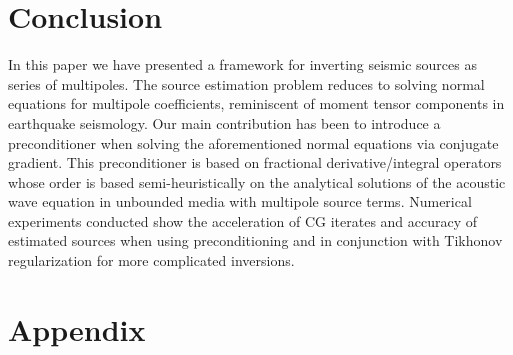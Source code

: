 


%

\section{Conclusion}
In this paper we have presented a framework for inverting seismic sources as series of multipoles.
The source estimation problem reduces to solving normal equations for multipole coefficients, reminiscent of moment tensor components in earthquake seismology.
Our main contribution has been to introduce a preconditioner when solving the aforementioned normal equations via conjugate gradient.
This preconditioner is based on fractional derivative/integral operators whose order is based semi-heuristically on the analytical solutions of the acoustic wave equation in unbounded media with multipole source terms.
Numerical experiments conducted show the acceleration of CG iterates and accuracy of estimated sources when using preconditioning and in conjunction with Tikhonov regularization for more complicated inversions.




\newpage


\section{Appendix}

